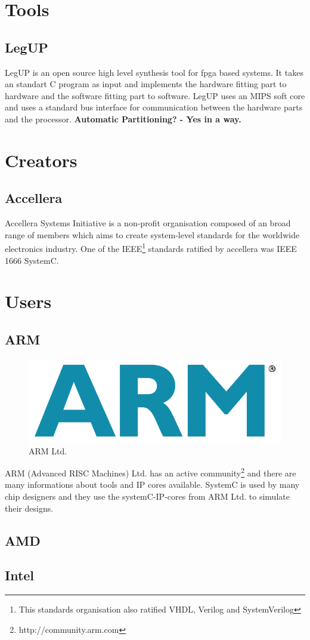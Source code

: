 \documentclass{article}
\begin{document}
	\section{Tools}	  
	  \subsection{LegUP}
	  LegUP is an open source high level synthesis tool for fpga based systems. 
	  It takes an standart C program as input and implements the hardware fitting part to hardware and the software fitting part to software.
	  LegUP uses an MIPS soft core and uses a standard bus interface for communication between the hardware parts and the processor.  
	  \textbf{Automatic Partitioning? - Yes in a way.}
	  
	\section{Creators}
	
	  \subsection{Accellera}
	  Accellera Systems Initiative is a non-profit organisation composed of an broad range of members which aims to create system-level standards for the worldwide electronics industry.
	  One of the IEEE\footnote{This standards organisation also ratified VHDL, Verilog and SystemVerilog} standards ratified by accellera was IEEE 1666 SystemC.
	  
	\section{Users}
	\subsection{ARM}
	    \begin{figure}[hp]
	      \centering
	      \includegraphics[scale=0.18]{../pictures/armlogo.jpg}
	      \caption{ARM Ltd.}
	      \label{fig:arm}
	    \end{figure}  
	    ARM (Advanced RISC Machines) Ltd. has an active community\footnote{http://community.arm.com} and there are many informations about tools and IP cores available.
	    SystemC is used by many chip designers and they use the systemC-IP-cores from ARM Ltd. to simulate their designs.
	  \subsection{AMD}
	  
	  \subsection{Intel}
	  
\end{document}
